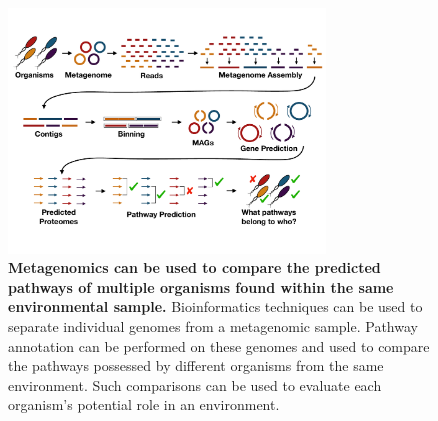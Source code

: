 \begin{figure}[!ht]
  \centering
	\includegraphics[width=0.75\textwidth]{media/metagenomics.pdf}
	 \caption[Metagenomics can be used to compare the predicted pathways of 
multiple organisms found within the same environmental 
sample.]{\textbf{Metagenomics can be used to compare the predicted pathways of 
multiple organisms found within the same environmental sample.} Bioinformatics 
techniques can be used to separate individual genomes from a metagenomic sample. 
Pathway annotation can be performed on these genomes and used to compare the 
pathways possessed by different organisms from the same environment. Such 
comparisons can be used to evaluate each organism's potential role in an 
environment.}
	 \label{fig:metagenomics}
\end{figure}

